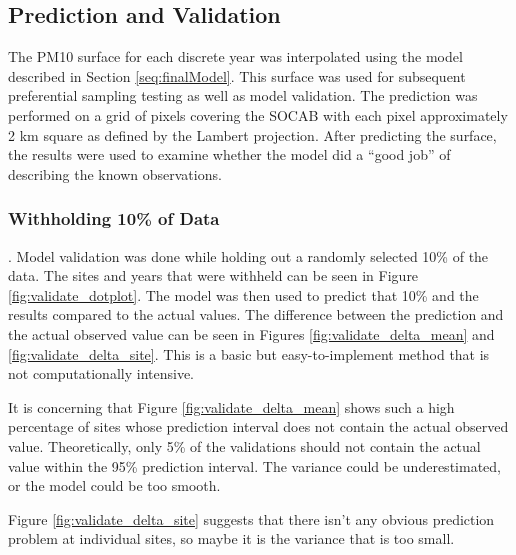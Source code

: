 \documentclass{article}
\begin{document}
\subsection{Prediction and Validation} \label{subsec:validation}
The \ac{PM10} surface for each discrete year was interpolated using the model described in Section \ref{seq:finalModel}.  This surface was used for subsequent preferential sampling testing as well as model validation.  The prediction was performed on a grid of pixels covering the \ac{SOCAB} with each pixel approximately 2 km square as defined by the Lambert projection.  After predicting the surface, the results were used to examine whether the model did a ``good job'' of describing the known observations.

\subsubsection*{Withholding 10\% of Data}
\label{subsubsec:withholding}.
Model validation was done while holding out a randomly selected 10\% of the data.  The sites and years that were withheld can be seen in Figure \ref{fig:validate_dotplot}.  The model was then used to predict that 10\% and the results compared to the actual values.  The difference between the prediction and the actual observed value can be seen in Figures \ref{fig:validate_delta_mean} and \ref{fig:validate_delta_site}.   This is a basic but easy-to-implement method that is not computationally intensive.

It is concerning that Figure \ref{fig:validate_delta_mean} shows such a high percentage of sites whose prediction interval does not contain the actual observed value.  Theoretically, only 5\% of the validations should not contain the actual value within the 95\% prediction interval.  The variance could be underestimated, or the model could be too smooth.

Figure \ref{fig:validate_delta_site} suggests that there isn't any obvious prediction problem at individual sites, so maybe it is the variance that is too small.
\end{document}
